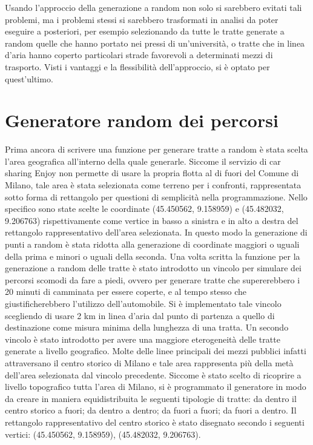 Usando l'approccio della generazione a random non solo si sarebbero evitati tali problemi, ma i problemi stessi si sarebbero trasformati in analisi da poter eseguire a posteriori, per esempio selezionando da tutte le tratte generate a random quelle che hanno portato nei pressi di un'università, o tratte che in linea d'aria hanno coperto particolari strade favorevoli a determinati mezzi di trasporto. Visti i vantaggi e la flessibilità dell'approccio, si è optato per quest'ultimo.

\section{Generatore random dei percorsi}

Prima ancora di scrivere una funzione per generare tratte a random è stata scelta l'area geografica all'interno della quale generarle. Siccome il servizio di car sharing Enjoy non permette di usare la propria flotta al di fuori del Comune di Milano, tale area è stata selezionata come terreno per i confronti, rappresentata sotto forma di rettangolo per questioni di semplicità nella programmazione. Nello specifico sono state scelte le coordinate (45.450562\textdegree, 9.158959\textdegree) e (45.482032\textdegree, 9.206763\textdegree) rispettivamente come vertice in basso a sinistra e in alto a destra del rettangolo rappresentativo dell'area selezionata. In questo modo la generazione di punti a random è stata ridotta alla generazione di coordinate maggiori o uguali della prima e minori o uguali della seconda. Una volta scritta la funzione per la generazione a random delle tratte è stato introdotto un vincolo per simulare dei percorsi scomodi da fare a piedi, ovvero per generare tratte che supererebbero i 20 minuti di camminata per essere coperte, e al tempo stesso che giustificherebbero l'utilizzo dell'automobile. Si è implementato tale vincolo scegliendo di usare 2 km in linea d'aria dal punto di partenza a quello di destinazione come misura minima della lunghezza di una tratta. Un secondo vincolo è stato introdotto per avere una maggiore eterogeneità delle tratte generate a livello geografico. Molte delle linee principali dei mezzi pubblici infatti attraversano il centro storico di Milano e tale area rappresenta più della metà dell'area selezionata dal vincolo precedente. Siccome è stato scelto di ricoprire a livello topografico tutta l'area di Milano, si è programmato il generatore in modo da creare in maniera equidistribuita le seguenti tipologie di tratte: da dentro il centro storico a fuori; da dentro a dentro; da fuori a fuori; da fuori a dentro. Il rettangolo rappresentativo del centro storico è stato disegnato secondo i seguenti vertici: (45.450562\textdegree, 9.158959\textdegree), (45.482032\textdegree, 9.206763\textdegree).

